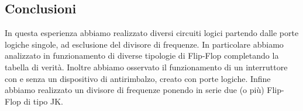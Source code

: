 \subsection*{Conclusioni}

In questa esperienza abbiamo realizzato diversi circuiti logici partendo dalle porte logiche singole, ad esclusione del divisore di frequenze.
In particolare abbiamo analizzato in funzionamento di diverse tipologie di Flip-Flop completando la tabella di verità.
Inoltre abbiamo osservato il funzionamento di un interruttore con e senza un dispositivo di antirimbalzo, creato con porte logiche.
Infine abbiamo realizzato un divisore di frequenze ponendo in serie due (o più) Flip-Flop di tipo JK.

